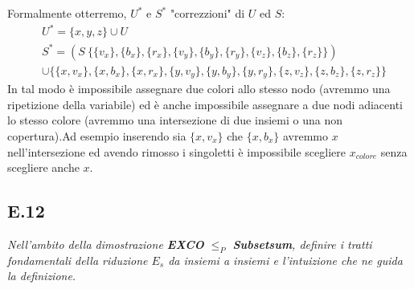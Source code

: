 \documentclass[a4paper]{article}
\begin{document}
Formalmente otterremo, $U^*$ e $S^*$ "correzzioni" di $U$ ed $S$:
\begin{align*}
&	U^* = \{x, y, z\} \cup U \\
& 	S^* = (S \ \{\{v_x\}, \{b_x\}, \{r_x\}, \{v_y\}, \{b_y\}, \{r_y\}, \{v_z\}, \{b_z\}, \{r_z\}\}) \\
&	\cup \{\{x, v_x\}, \{x, b_x\}, \{x, r_x\}, \{y, v_y\}, \{y, b_y\}, \{y, r_y\}, \{z, v_z\}, \{z, b_z\}, \{z, r_z\}\}
\end{align*}
In tal modo è impossibile assegnare due colori allo stesso nodo (avremmo una ripetizione della variabile) ed è anche impossibile assegnare a due nodi adiacenti lo stesso colore (avremmo una intersezione di due insiemi o una non copertura).Ad esempio inserendo sia $\{x,v_x\}$ che $\{x,b_x\}$ avremmo $x$ nell'intersezione ed avendo rimosso i singoletti è impossibile scegliere $x_{colore}$ senza scegliere anche $x$.
\subsection{E.12}
\emph{Nell’ambito della dimostrazione \textbf{EXCO} $\leq_P$ \textbf{Subsetsum}, definire i tratti fondamentali della riduzione $E_s$ da insiemi a insiemi e l’intuizione che ne guida la definizione.}
\end{document}
